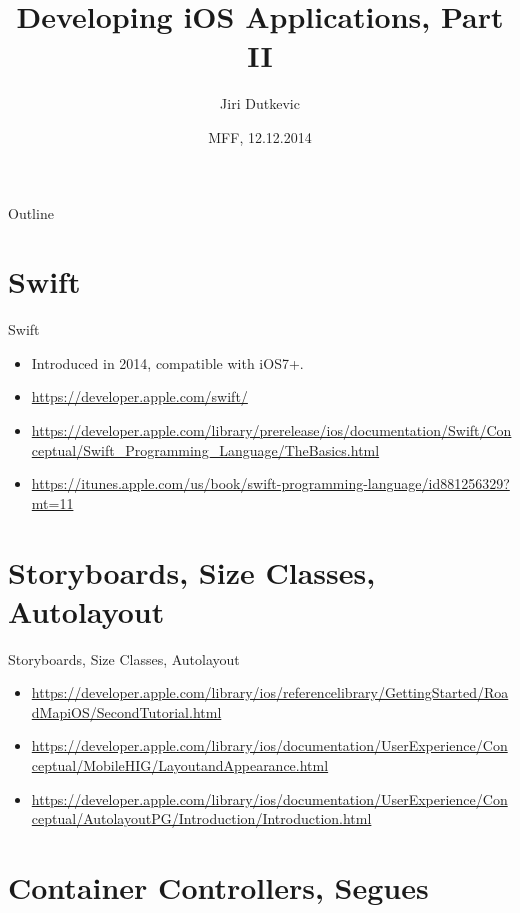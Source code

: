 \documentclass{beamer}
\title{Developing iOS Applications, Part II}
\author{Jiri Dutkevic}
\institute[Avast]
{
    jd@avast.com\\
    Avast Mobile
}
\date{MFF, 12.12.2014}
\begin{document}
\begin{frame}
  \titlepage
\end{frame}

\begin{frame}{Outline}
  \tableofcontents
\end{frame}

\section{Swift}

\begin{frame}{Swift}
    \begin{itemize}
      \item {
        Introduced in 2014, compatible with iOS7+.
      }
      \item {
        \url{https://developer.apple.com/swift/}
      }
      \item {
        \url{https://developer.apple.com/library/prerelease/ios/documentation/Swift/Conceptual/Swift_Programming_Language/TheBasics.html}
      }
      \item {
        \url{https://itunes.apple.com/us/book/swift-programming-language/id881256329?mt=11}
      }
    \end{itemize}
\end{frame}

\section{Storyboards, Size Classes, Autolayout}

\begin{frame}{Storyboards, Size Classes, Autolayout}
    \begin{itemize}
    \item {
        \url {https://developer.apple.com/library/ios/referencelibrary/GettingStarted/RoadMapiOS/SecondTutorial.html}
    }
    \item {
        \url{https://developer.apple.com/library/ios/documentation/UserExperience/Conceptual/MobileHIG/LayoutandAppearance.html}
    }
    \item {
        \url {https://developer.apple.com/library/ios/documentation/UserExperience/Conceptual/AutolayoutPG/Introduction/Introduction.html}
    }
    \end{itemize}
\end{frame}

\section{Container Controllers, Segues}
\end{document}
